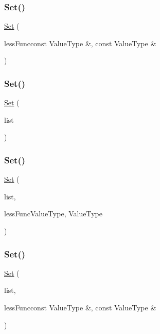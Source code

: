 \subsubsection{\texorpdfstring{Set()}{Set()}\hspace{0.1cm}{\footnotesize\ttfamily [3/7]}}
{\footnotesize\ttfamily \mbox{\hyperlink{classSet}{Set}} (\begin{DoxyParamCaption}\item[{bool }]{less\+Funcconst Value\+Type \&, const Value\+Type \& }\end{DoxyParamCaption})}

\mbox{\label{classSet_a914062b091ae2bcd6945e702dc700dd2}} 
\subsubsection{\texorpdfstring{Set()}{Set()}\hspace{0.1cm}{\footnotesize\ttfamily [4/7]}}
{\footnotesize\ttfamily \mbox{\hyperlink{classSet}{Set}} (\begin{DoxyParamCaption}\item[{std\+::initializer\+\_\+list$<$ Value\+Type $>$}]{list }\end{DoxyParamCaption})}

\mbox{\label{classSet_a865d21af08e175e4f04cceee1e02e0d2}} 
\subsubsection{\texorpdfstring{Set()}{Set()}\hspace{0.1cm}{\footnotesize\ttfamily [5/7]}}
{\footnotesize\ttfamily \mbox{\hyperlink{classSet}{Set}} (\begin{DoxyParamCaption}\item[{std\+::initializer\+\_\+list$<$ Value\+Type $>$}]{list,  }\item[{bool }]{less\+FuncValue\+Type, Value\+Type }\end{DoxyParamCaption})}

\mbox{\label{classSet_aa928b08304d74b8d30ce76fb831cec5e}} 
\subsubsection{\texorpdfstring{Set()}{Set()}\hspace{0.1cm}{\footnotesize\ttfamily [6/7]}}
{\footnotesize\ttfamily \mbox{\hyperlink{classSet}{Set}} (\begin{DoxyParamCaption}\item[{std\+::initializer\+\_\+list$<$ Value\+Type $>$}]{list,  }\item[{bool }]{less\+Funcconst Value\+Type \&, const Value\+Type \& }\end{DoxyParamCaption})}

